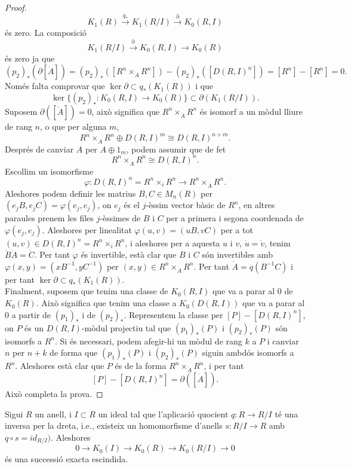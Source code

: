 \begin{proof}
$$
K_1(R)\xrightarrow{q_*}K_1(R/I)\xrightarrow{\partial}K_0(R,I)
$$
és zero. La composició
$$
K_1(R/I)\xrightarrow{\partial} K_0(R,I) \rightarrow K_0(R)
$$
és zero ja que 
$$
(p_2)_*( \partial [\dot{A}]) = (p_2)_* ([R^n \times_{\dot{A}} R^n]) - (p_2)_*([D(R,I)^n])=[R^n]-[R^n]=0.
$$
\indent Només falta comprovar que $\ker \partial \subset q_*(K_1(R))$ i que 
$$
\ker \{ (p_2)_* : K_0(R,I) \rightarrow K_0(R) \} \subset \partial (K_1(R/I)).
$$
Suposem $\partial ([\dot{A}])=0$, això significa que $R^n\times_{\dot{A}}R^n$ és isomorf a un mòdul lliure de rang $n$, o que per alguna $m$,
$$
R^n \times_{\dot{A}}R^n \oplus D(R,I)^m \cong D(R,I)^{n+m}.
$$
Després de canviar $A$ per $A\oplus 1_m$, podem assumir que de fet
$$
R^n\times_{\dot{A}}R^n \cong D(R,I)^n.
$$
Escollim un isomorfisme 
$$
\varphi: D(R,I)^n = R^n\times_{i}R^n \rightarrow R^n \times_{\dot{A}} R^n.
$$
Aleshores podem definir les matrius $B,C\in M_n(R)$ per $(e_jB,e_jC) = \varphi(e_j,e_j)$, on $e_j$ és el $j$-èssim vector bàsic de $R^n$, en altres paraules prenem les files $j$-èssimes de $B$ i $C$ per a primera i segona coordenada de $\varphi (e_j, e_j)$. Aleshores per linealitat $\varphi (u,v) = (uB, vC)$ per a tot $(u,v)\in D(R,I)^n = R^n \times_{i}R^n$, i aleshores per a aquesta $u$ i $v$, $\dot{u}=\dot{v}$, tenim $\dot{B}\dot{A}=\dot{C}$. Per tant $\varphi$ és invertible, està clar que $B$ i $C$ són invertibles amb $\varphi(x,y)=(xB^{-1},yC^{-1})$ per $(x,y)\in R^n \times_{\dot{A}}R^n$. Per tant $\dot{A}=q(B^{-1}C)$ i per tant $\ker \partial \subset q_* (K_1(R))$. \\
\indent Finalment, suposem que tenim una classe de $K_0(R,I)$ que va a parar al $0$ de $K_0(R)$. Això significa que tenim una classe a $K_0(D(R,I))$ que va a parar al $0$ a partir de $(p_1)_*$ i de $(p_2)_*$. Representem la classe per $[P]-[D(R,I)^n]$, on $P$ és un $D(R,I)$-mòdul projectiu tal que $(p_1)_*(P)$ i $(p_2)_*(P)$ són isomorfs a $R^n$. Si és necessari, podem afegir-hi un mòdul de rang $k$ a $P$ i canviar $n$ per $n+k$ de forma que $(p_1)_*(P)$ i $(p_2)_*(P)$ siguin ambdós isomorfs a $R^n$. Aleshores està clar que $P$ és de la forma $R^n \times_{\dot{A}} R^n$, i per tant
$$
[P]-[D(R,I)^n]=\partial ([\dot{A}]).
$$
Això completa la prova.
\end{proof}


\begin{corollary}
Sigui $R$ un anell, i $I\subset R$ un ideal tal que l'aplicació quocient $q:R\rightarrow R/I$ té una inversa per la dreta, i.e., existeix un homomorfisme d'anells $s:R/I\rightarrow R$ amb $q\circ s = id_{R/I})$. Aleshores
$$
0\rightarrow K_0(I) \rightarrow K_0(R) \rightarrow K_0(R/I) \rightarrow 0
$$
és una successió exacta escindida.
\end{corollary}

